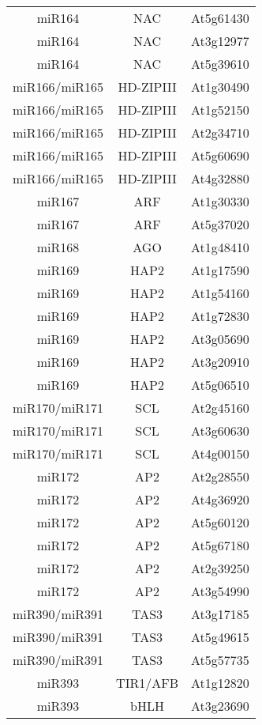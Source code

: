 \begin{table}[htbp!]
\begin{tabular}{ccc}
miR164        & NAC          & At5g61430 \\
miR164        & NAC          & At3g12977 \\
miR164        & NAC          & At5g39610 \\
miR166/miR165 & HD-ZIPIII    & At1g30490 \\
miR166/miR165 & HD-ZIPIII    & At1g52150 \\
miR166/miR165 & HD-ZIPIII    & At2g34710 \\
miR166/miR165 & HD-ZIPIII    & At5g60690 \\
miR166/miR165 & HD-ZIPIII    & At4g32880 \\
miR167        & ARF          & At1g30330 \\
miR167        & ARF          & At5g37020 \\
miR168        & AGO          & At1g48410 \\
miR169        & HAP2         & At1g17590 \\
miR169        & HAP2         & At1g54160 \\
miR169        & HAP2         & At1g72830 \\
miR169        & HAP2         & At3g05690 \\
miR169        & HAP2         & At3g20910 \\
miR169        & HAP2         & At5g06510 \\
miR170/miR171 & SCL          & At2g45160 \\
miR170/miR171 & SCL          & At3g60630 \\
miR170/miR171 & SCL          & At4g00150 \\
miR172        & AP2          & At2g28550 \\
miR172        & AP2          & At4g36920 \\
miR172        & AP2          & At5g60120 \\
miR172        & AP2          & At5g67180 \\
miR172        & AP2          & At2g39250 \\
miR172        & AP2          & At3g54990 \\
miR390/miR391 & TAS3         & At3g17185 \\
miR390/miR391 & TAS3         & At5g49615 \\
miR390/miR391 & TAS3         & At5g57735 \\
miR393        & TIR1/AFB     & At1g12820 \\
miR393        & bHLH         & At3g23690 \\

\end{tabular}
\end{table}
